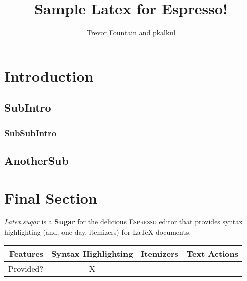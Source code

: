 \documentclass[10pt,twocolumn]{article}
\title{Sample Latex for Espresso!}
\author{Trevor Fountain and pkalkul}
\begin{document}
\maketitle

\section{Introduction}

\subsection{SubIntro}

\subsubsection{SubSubIntro}

\subsection{AnotherSub}

\section{Final Section}


\emph{Latex.sugar} is a \textbf{Sugar} for the delicious \textsc{Espresso} editor that provides syntax highlighting (and, one day, itemizers) for LaTeX documents.

\begin{table}[h!]
\begin{tabular}{r|c c c}
\textbf{Features} & Syntax Highlighting & Itemizers & Text Actions \\ \hline
Provided? & X & &
\end{tabular}
\end{table}
\end{document}
